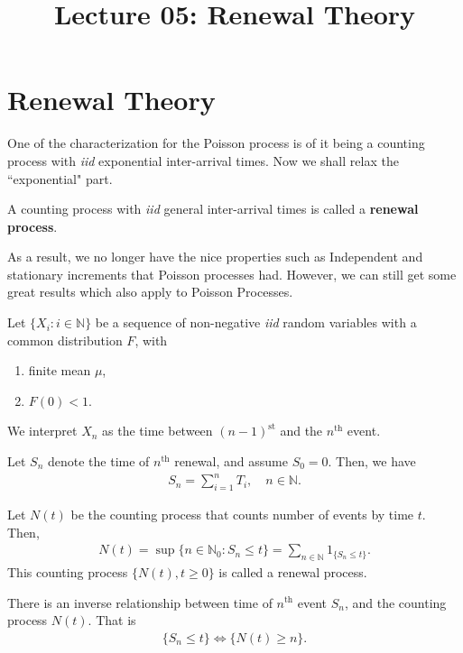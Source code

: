 \documentclass[a4paper,10pt, english]{article}
\title{Lecture 05: Renewal Theory}
\author{}
\begin{document}
\maketitle

\section{Renewal Theory}
One of the characterization for the Poisson process is of it being a counting process with \emph{iid} exponential inter-arrival times. Now we shall relax the ``exponential" part. 
\begin{defn} A counting process with \emph{iid} general inter-arrival times is called a \textbf{renewal process}.
\end{defn}
As a result, we no longer have the nice properties such as Independent and stationary increments that Poisson processes had. However, we can still get some great results which also apply to Poisson Processes. 

\begin{defn} Let $\{X_i: i \in \mathbb{N}\}$ be a sequence of non-negative \emph{iid} random variables with a common distribution $F$, with 
\begin{enumerate}
	\item finite mean $\mu$, %
	\item $F(0) < 1$.%
\end{enumerate}
\end{defn}
We interpret $X_n$ as the time between $(n - 1)^{\mathrm{st}}$ and the $n^{\mathrm{th}}$ event. 

\begin{defn} Let $S_n$ denote the time of $n^{\mathrm{th}}$ renewal, and assume $S_0 = 0$. Then, we have
\begin{align*} 
S_n = \sum_{i=1}^n T_i, \quad n\in \mathbb{N}. 
\end{align*}
\end{defn}
\begin{defn} Let $N(t)$ be the counting process that counts number of events by time $t$. Then,
\begin{align*} 
N(t) = \sup\{n \in \mathbb{N}_0 : S_n \leq t\} = \sum_{n \in \mathbb{N}}1_{\{S_n \leq t\}}.
\end{align*} 
This counting process $\{N(t), t \geq 0\}$ is called a renewal process.
\end{defn}
\begin{lem}
There is an inverse relationship between time of $n^{\mathrm{th}}$ event $S_n$, and the counting process $N(t)$. That is
\begin{align}
\label{eq:InverseRelationship}
\{S_n \leq t\} \iff \{N(t) \geq n\}.
\end{align}
\end{lem}
\end{document}
